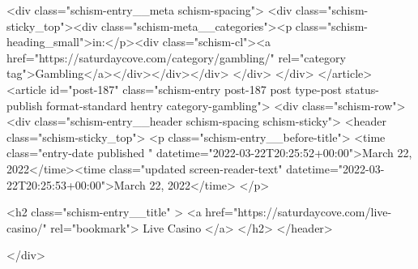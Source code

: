 {		<div class="schism-entry__meta schism-spacing">			<div class="schism-sticky_top"><div class="schism-meta__categories"><p class="schism-heading_small">in:</p><div class="schism-cl"><a href="https://saturdaycove.com/category/gambling/" rel="category tag">Gambling</a></div></div></div>		</div>
	</div>
</article>
<article id="post-187" class="schism-entry post-187 post type-post status-publish format-standard hentry category-gambling">
	<div class="schism-row">		<div class="schism-entry__header schism-spacing schism-sticky">			<header class="schism-sticky_top">				<p class="schism-entry__before-title">
					<time class="entry-date published " datetime="2022-03-22T20:25:52+00:00">March 22, 2022</time><time class="updated screen-reader-text" datetime="2022-03-22T20:25:53+00:00">March 22, 2022</time>				</p>

				<h2 class="schism-entry__title" >
					<a href="https://saturdaycove.com/live-casino/" rel="bookmark">
						Live Casino					</a>
				</h2>
			</header>

					</div>

}
